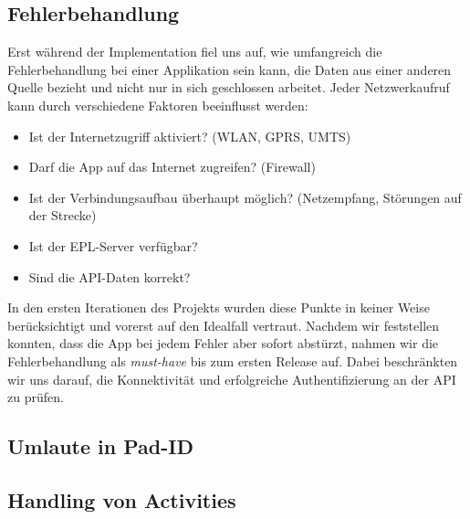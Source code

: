 \subsection{Fehlerbehandlung}
Erst während der Implementation fiel uns auf, wie umfangreich die Fehlerbehandlung bei einer Applikation sein kann, die Daten aus einer anderen Quelle bezieht und nicht nur in sich geschlossen arbeitet.
Jeder Netzwerkaufruf kann durch verschiedene Faktoren beeinflusst werden:
\begin{itemize}
	\item Ist der Internetzugriff aktiviert? (WLAN, GPRS, UMTS)
	\item Darf die App auf das Internet zugreifen? (Firewall)
	\item Ist der Verbindungsaufbau überhaupt möglich? (Netzempfang, Störungen auf der Strecke)
	\item Ist der EPL-Server verfügbar?
	\item Sind die API-Daten korrekt?
\end{itemize}

In den ersten Iterationen des Projekts wurden diese Punkte in keiner Weise berücksichtigt und vorerst auf den Idealfall vertraut.
Nachdem wir feststellen konnten, dass die App bei jedem Fehler aber sofort abstürzt, nahmen wir die Fehlerbehandlung als \textit{must-have} bis zum ersten Release auf.
Dabei beschränkten wir uns darauf, die Konnektivität und erfolgreiche Authentifizierung an der API zu prüfen.


\subsection{Umlaute in Pad-ID}


\subsection{Handling von Activities}

